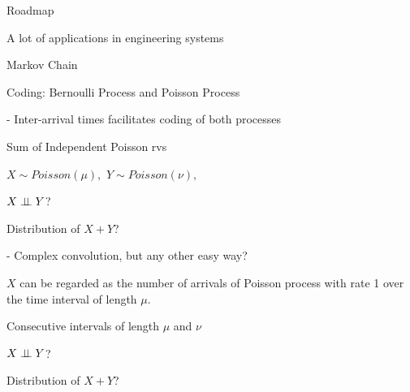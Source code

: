 \begin{frame}{Roadmap}

\plitemsep 0.1in

\bci 
\item A lot of applications in engineering systems


\bigskip

\item {}

\medskip
\item {}
\item {}
\item {}

\medskip
\item Markov Chain

\eci 

\end{frame}


\begin{frame}{Coding: Bernoulli Process and Poisson Process}

- Inter-arrival times facilitates coding of both processes

\smallskip
\centering
{}

\smallskip
{}


\end{frame}

\begin{frame}{Sum of Independent Poisson rvs}

\plitemsep 0.1in

\bci 

\item $X \sim Poisson(\mu),$  $Y \sim Poisson(\nu),$  

\item<2->  $X \perp \!\!\! \perp Y$?

\item<3->  Distribution of $X+Y$?

- Complex convolution, but any other easy way?

\item<4-> $X$ can be regarded as the number of arrivals of Poisson process with rate 1 over the time interval of length $\mu.$ 

\item<5-> Consecutive intervals of length $\mu$ and $\nu$

\item<6->  $X \perp \!\!\! \perp Y$? 

\item<7->  Distribution of $X+Y$? 

\eci 


\end{frame}


